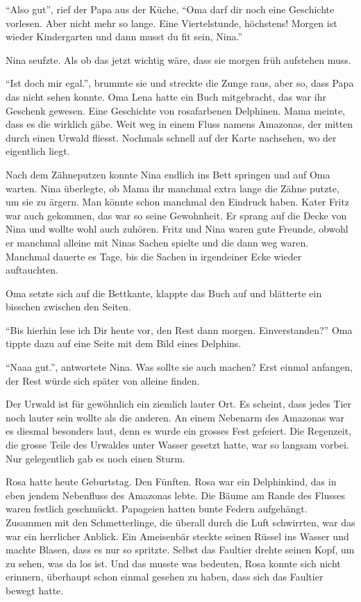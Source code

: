 \enquote{Also gut}, rief der Papa aus der Küche, \enquote{Oma darf dir noch eine Geschichte vorlesen. Aber nicht mehr so lange. Eine Viertelstunde, höchstens! Morgen ist wieder Kindergarten und dann musst du fit sein, Nina.}

Nina seufzte. Als ob das jetzt wichtig wäre, dass sie morgen früh aufstehen muss. 

\enquote{Ist doch mir egal.}, brummte sie und streckte die Zunge raus, aber so, dass Papa das nicht sehen konnte. Oma Lena hatte ein Buch mitgebracht, das war ihr Geschenk gewesen. Eine Geschichte von rosafarbenen Delphinen. Mama meinte, dass es die wirklich gäbe. Weit weg in einem Fluss namens Amazonas, der mitten durch einen Urwald fliesst. Nochmals schnell auf der Karte nachsehen, wo der eigentlich liegt.

Nach dem Zähneputzen konnte Nina endlich ins Bett springen und auf Oma warten. Nina überlegte, ob Mama ihr manchmal extra lange die Zähne putzte, um sie zu ärgern. Man könnte schon manchmal den Eindruck haben. Kater Fritz war auch gekommen, das war so seine Gewohnheit. Er sprang auf die Decke von Nina und wollte wohl auch zuhören. Fritz und Nina waren gute Freunde, obwohl er manchmal alleine mit Ninas Sachen spielte und die dann weg waren. Manchmal dauerte es Tage, bis die Sachen in irgendeiner Ecke wieder auftauchten. 

Oma setzte sich auf die Bettkante, klappte das Buch auf und blätterte ein bisschen zwischen den Seiten.

\enquote{Bis hierhin lese ich Dir heute vor, den Rest dann morgen. Einverstanden?} Oma tippte dazu auf eine Seite mit dem Bild eines Delphins. 

\enquote{Naaa gut.}, antwortete Nina. Was sollte sie auch machen? Erst einmal anfangen, der Rest würde sich später von alleine finden.

\vspace{10pt}
 \centerline{\Huge \Dolphin[red]}
\vspace{10pt}

Der Urwald ist für gewöhnlich ein ziemlich lauter Ort. Es scheint, dass jedes Tier noch lauter sein wollte als die anderen. An einem Nebenarm des Amazonas war es diesmal besonders laut, denn es wurde ein grosses Fest gefeiert. Die Regenzeit, die grosse Teile des Urwaldes unter Wasser gesetzt hatte, war so langsam vorbei. Nur gelegentlich gab es noch einen Sturm. 

Rosa hatte heute Geburtstag. Den Fünften. Rosa war ein Delphinkind, das in eben jendem Nebenfluss des Amazonas lebte. Die Bäume am Rande des Flusses waren festlich geschmückt. Papageien hatten bunte Federn aufgehängt. Zusammen mit den Schmetterlinge, die überall durch die Luft schwirrten, war das war ein herrlicher Anblick. Ein Ameisenbär steckte seinen Rüssel ins Wasser und machte Blasen, dass es nur so spritzte. Selbst das Faultier drehte seinen Kopf, um zu sehen, was da los ist. Und das musste was bedeuten, Rosa konnte sich nicht erinnern, überhaupt schon einmal gesehen zu haben, dass sich das Faultier bewegt hatte.

